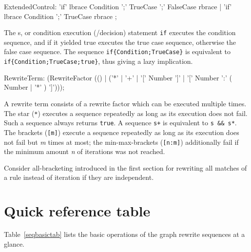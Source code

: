 \begin{rail} 
  ExtendedControl: 
	'if' lbrace Condition ';' TrueCase ';' FalseCase rbrace |
	'if' lbrace Condition ';' TrueCase rbrace
	;
\end{rail}

The s, or condition execution (/decision) statement \texttt{if} executes the condition sequence, and if it yielded true executes the true case sequence, otherwise the false case sequence.
The sequence \verb#if{Condition;TrueCase}# is equivalent to \verb#if{Condition;TrueCase;true}#, thus giving a lazy implication.

\begin{rail}
  RewriteTerm: 
    (RewriteFactor (() | ('*' | '+' | '[' Number ']' | '[' Number ':' ( Number | '*' ) ']')));
\end{rail}

A rewrite term consists of a rewrite factor which can be executed multiple times.
The star (\texttt{*}) executes a sequence repeatedly as long as its execution does not fail. 
Such a sequence always returns \texttt{true}.
A sequence \verb#s+# is equivalent to \verb#s && s*#.
The brackets (\texttt{[m]}) execute a sequence repeatedly as long as its execution does not fail but \emph{m} times at most;
the min-max-brackets (\texttt{[n:m]}) additionally fail if the minimum amount \emph{n} of iterations was not reached.

\begin{note}
Consider all-bracketing introduced in the first section for rewriting all matches of a rule instead of iteration if they are independent.
\end{note}


\section{Quick reference table}

Table~\ref{seqbasictab} lists the basic operations of the graph rewrite sequences at a glance.

